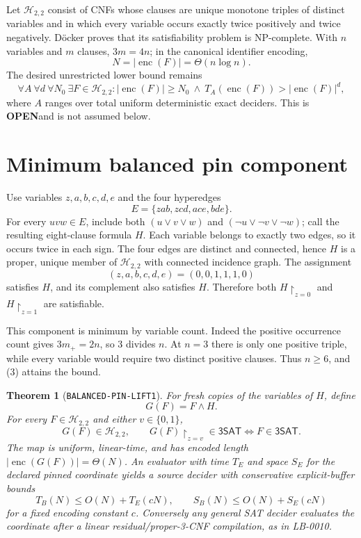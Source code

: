 \documentclass[11pt]{article}
\newtheorem{theorem}{Theorem}
\newcommand{\SAT}{\mathsf{3SAT}}
\newcommand{\OPEN}{\textbf{OPEN}}
\begin{document}
Let $\mathcal H_{2,2}$ consist of CNFs whose clauses are unique monotone
triples of distinct variables and in which every variable occurs exactly
twice positively and twice negatively.  D\"ocker proves that its
satisfiability problem is NP-complete.  With $n$ variables and $m$ clauses,
$3m=4n$; in the canonical identifier encoding,
\[
 N=|\operatorname{enc}(F)|=\Theta(n\log n).                  \tag{2}
\]
The desired unrestricted lower bound remains
\[
\tag{UCORE-TIME1}
\forall A\ \forall d\ \forall N_0\ \exists F\in\mathcal H_{2,2}:
 |\operatorname{enc}(F)|\ge N_0
 \ \wedge\ T_A(\operatorname{enc}(F))>|\operatorname{enc}(F)|^d,
\]
where $A$ ranges over total uniform deterministic exact deciders.  This is
\OPEN and is not assumed below.

\section{Minimum balanced pin component}

Use variables $z,a,b,c,d,e$ and the four hyperedges
\[
 E=\{zab,zcd,ace,bde\}.                                     \tag{3}
\]
For every $uvw\in E$, include both $(u\vee v\vee w)$ and
$(\neg u\vee\neg v\vee\neg w)$; call the resulting eight-clause formula
$H$.  Each variable belongs to exactly two edges, so it occurs twice in
each sign.  The four edges are distinct and connected, hence $H$ is a
proper, unique member of $\mathcal H_{2,2}$ with connected incidence graph.
The assignment
\[
 (z,a,b,c,d,e)=(0,0,1,1,1,0)                               \tag{4}
\]
satisfies $H$, and its complement also satisfies $H$.  Therefore both
$H\upharpoonright_{z=0}$ and $H\upharpoonright_{z=1}$ are satisfiable.

This component is minimum by variable count.  Indeed the positive occurrence
count gives $3m_+=2n$, so $3$ divides $n$.  At $n=3$ there is only one
positive triple, while every variable would require two distinct positive
clauses.  Thus $n\ge6$, and (3) attains the bound.

\begin{theorem}[\texttt{BALANCED-PIN-LIFT1}]
For fresh copies of the variables of $H$, define
\[
 G(F)=F\wedge H.                                            \tag{5}
\]
For every $F\in\mathcal H_{2,2}$ and either $v\in\{0,1\}$,
\[
 G(F)\in\mathcal H_{2,2},\qquad
 G(F)\upharpoonright_{z=v}\in\SAT
 \iff F\in\SAT.                                            \tag{6}
\]
The map is uniform, linear-time, and has encoded length
$|\operatorname{enc}(G(F))|=\Theta(N)$.  An evaluator with time $T_E$ and
space $S_E$ for the declared pinned coordinate yields a source decider with
conservative explicit-buffer bounds
\[
 T_B(N)\le O(N)+T_E(cN),\qquad
 S_B(N)\le O(N)+S_E(cN)                                    \tag{7}
\]
for a fixed encoding constant $c$.  Conversely any general SAT decider
evaluates the coordinate after a linear residual/proper-3-CNF compilation,
as in LB-0010.
\end{theorem}
\end{document}
